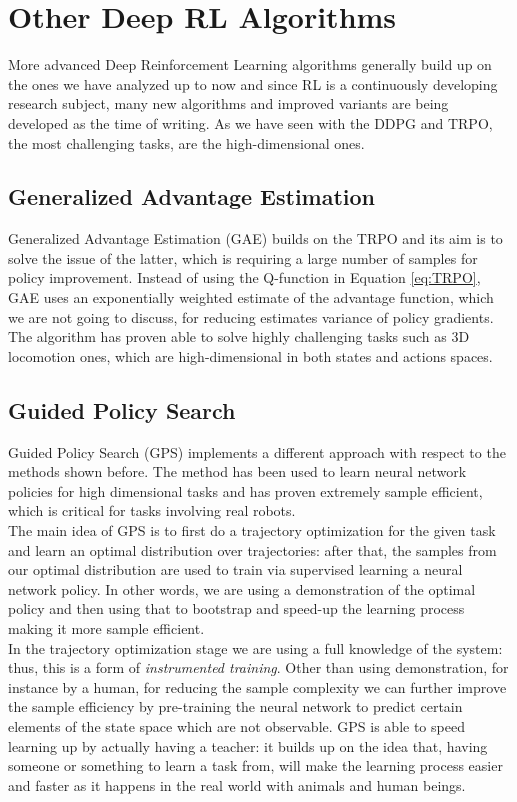 \section{Other Deep RL Algorithms}

More advanced Deep Reinforcement Learning algorithms generally build up on the ones we have analyzed up to now and since RL is a continuously developing research subject, many new algorithms and improved variants are being developed as the time of writing. As we have seen with the DDPG and TRPO, the most challenging tasks,  are the high-dimensional ones. 

\subsection{Generalized Advantage Estimation}
Generalized Advantage Estimation (GAE)\cite{schulman2015high} builds on the TRPO and its aim is to solve the issue of the latter, which is requiring a large number of samples for policy improvement. Instead of using the Q-function in Equation \ref{eq:TRPO}, GAE uses an exponentially weighted estimate of the advantage function, which we are not going to discuss, for reducing estimates variance of policy gradients. 
\\
\indent The algorithm has proven able to solve highly challenging tasks such as 3D locomotion ones, which are high-dimensional in both states and actions spaces.

\subsection{Guided Policy Search}
Guided Policy Search (GPS)\cite{levine2013guided} implements a different approach with respect to the methods shown before. The method has been used to learn neural network policies for high dimensional tasks and has proven extremely sample efficient, which is critical for tasks involving real robots.
\\
\indent The main idea of GPS is to first do a trajectory optimization for the given task and learn an optimal distribution over trajectories: after that, the samples from our optimal distribution are used to train via supervised learning a neural network policy. In other words, we are using a demonstration of the optimal policy and then using that to bootstrap and speed-up the learning process making it more sample efficient.
\\
\indent In the trajectory optimization stage we are using a full knowledge of the system: thus, this is a form of \textit{instrumented training}. Other than using demonstration, for instance by a human, for reducing the sample complexity we can further improve the sample efficiency by pre-training the neural network to predict certain elements of the state space which are not observable. GPS is able to speed learning up by actually having a teacher: it builds up on the idea that, having someone or something to learn a task from, will make the learning process easier and faster as it happens in the real world with animals and human beings.


